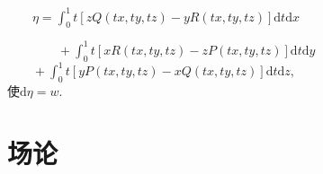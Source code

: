 \begin{enumerate}
\begin{enumerate}
				$\qquad \eta = \displaystyle{\int_{0}^{1}t[zQ(tx,ty,tz)-yR(tx,ty,tz)]\mathrm{d}t\mathrm{d}x}$\\ \qquad 
				
				$\qquad\qquad+\displaystyle{\int_{0}^{1}t[xR(tx,ty,tz)-zP(tx,ty,tz)]\mathrm{d}t\mathrm{d}y}$\\ \qquad
				$
				\qquad +\displaystyle{\int_{0}^{1}t[yP(tx,ty,tz)-xQ(tx,ty,tz)]\mathrm{d}t\mathrm{d}z},$\\
				
			使$\mathrm{d}\eta=w$.
	\end{enumerate}
\end{enumerate}


\section{场论}
